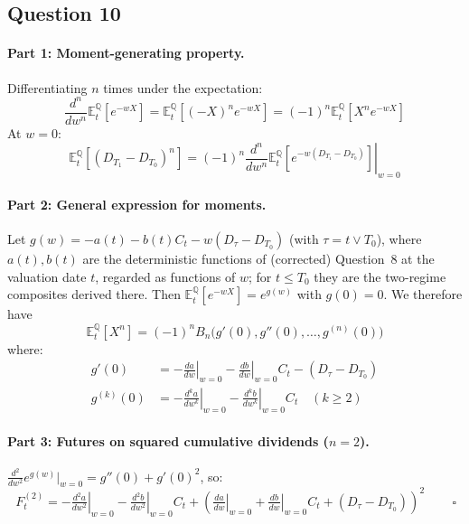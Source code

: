 \documentclass[12pt,a4paper]{article}
\begin{document}
\subsection*{Question 10}

\paragraph{Part 1: Moment-generating property.}
Differentiating $n$ times under the expectation:
\begin{equation*}
    \frac{d^n}{dw^n} \mathbb{E}^{\mathbb{Q}}_t[e^{-wX}] = \mathbb{E}^{\mathbb{Q}}_t[(-X)^n e^{-wX}] = (-1)^n \mathbb{E}^{\mathbb{Q}}_t[X^n e^{-wX}]
\end{equation*}
At $w = 0$:
\begin{equation*}
    \boxed{\,\mathbb{E}^{\mathbb{Q}}_t[(D_{T_1} - D_{T_0})^n] = (-1)^n \left.\frac{d^n}{dw^n}\mathbb{E}^{\mathbb{Q}}_t[e^{-w(D_{T_1} - D_{T_0})}]\right|_{w=0}\,}
\end{equation*}

\paragraph{Part 2: General expression for moments.}
Let $g(w) = -a(t) - b(t)C_t - w(D_\tau - D_{T_0})$ (with $\tau = t \vee T_0$), where $a(t),b(t)$ are the deterministic functions of (corrected) Question~8 at the valuation date $t$, regarded as functions of $w$; for $t \le T_0$ they are the two-regime composites derived there. Then $\mathbb{E}^{\mathbb{Q}}_t[e^{-wX}] = e^{g(w)}$ with $g(0) = 0$. We therefore have
\begin{equation*}
    \mathbb{E}^{\mathbb{Q}}_t[X^n] = (-1)^n B_n\!\big(g'(0), g''(0), \dots, g^{(n)}(0)\big)
\end{equation*}
where:
\begin{align*}
    g'(0) &= -\left.\tfrac{da}{dw}\right|_{w=0} - \left.\tfrac{db}{dw}\right|_{w=0}\!C_t - (D_\tau - D_{T_0}) \\
    g^{(k)}(0) &= -\left.\tfrac{d^ka}{dw^k}\right|_{w=0} - \left.\tfrac{d^kb}{dw^k}\right|_{w=0}\!C_t \quad (k \geq 2)
\end{align*}

\paragraph{Part 3: Futures on squared cumulative dividends ($n=2$).}
$\frac{d^2}{dw^2}e^{g(w)}\big|_{w=0} = g''(0) + g'(0)^2$, so:
\begin{equation*}
    \boxed{\,F_t^{(2)} = -\!\left.\tfrac{d^2a}{dw^2}\right|_{w=0} - \!\left.\tfrac{d^2b}{dw^2}\right|_{w=0}\!C_t + \!\left(\!\left.\tfrac{da}{dw}\right|_{w=0} + \!\left.\tfrac{db}{dw}\right|_{w=0}\!C_t + (D_\tau - D_{T_0})\!\right)^{\!2}\,} \qquad \square
\end{equation*}
\end{document}

